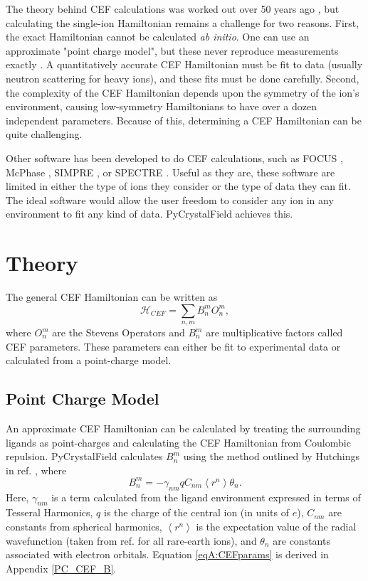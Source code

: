 \documentclass[twocolumn,english,prb]{revtex4-2}
\begin{document}
The theory behind CEF calculations was worked out over 50 years ago \cite{Stevens1952,Hutchings1964}, but  calculating the single-ion Hamiltonian remains a challenge for two reasons. First, the exact Hamiltonian cannot be calculated \textit{ab initio}. One can use an approximate "point charge model", but these never reproduce measurements exactly \cite{EDVARDSSON1998,Mesot1998}. A quantitatively accurate CEF Hamiltonian must be fit to data (usually neutron scattering for heavy ions), and these fits must be done carefully. Second, the complexity of the CEF Hamiltonian depends upon the symmetry of the ion's environment, causing low-symmetry Hamiltonians to have over a dozen independent parameters. Because of this, determining a CEF Hamiltonian can be quite challenging.

Other software has been developed to do CEF calculations, such as FOCUS \cite{FOCUS}, McPhase \cite{McPhase}, SIMPRE \cite{SIMPRE}, or SPECTRE \cite{SPECTRE}. Useful as they are, these software are limited in either the type of ions they consider or the type of data they can fit. The ideal software would allow the user freedom to consider any ion in any environment to fit any kind of data. PyCrystalField achieves this.


\section{Theory}


The general CEF Hamiltonian can be written as 
\begin{equation}
\mathcal{H}_{CEF} =\sum_{n,m} B_{n}^{m}O_{n}^{m},
\end{equation}
where $O_{n}^{m}$ are the Stevens Operators \cite{Stevens1952,Hutchings1964} and $B_{n}^{m}$ are multiplicative factors called CEF parameters. These parameters can either be fit to experimental data or calculated from a point-charge model.

\subsection{Point Charge Model}

An approximate CEF Hamiltonian can be calculated by treating the surrounding ligands as point-charges and calculating the CEF Hamiltonian from Coulombic repulsion. PyCrystalField calculates $B_{n}^{m}$ using the method outlined by Hutchings in ref. \cite{Hutchings1964}, where
\begin{equation}
B_{n}^{m}=-\gamma_{nm}q C_{nm}\left\langle r^{n}\right\rangle \theta_{n}.
\label{eqA:CEFparams}
\end{equation}
Here, $\gamma_{nm}$ is a term calculated from the ligand environment expressed in terms of Tesseral Harmonics, $q$ is the charge of  the central ion (in units of $e$), $C_{nm}$ are constants from spherical harmonics, $\left\langle r^{n}\right\rangle$ is the expectation value of the radial wavefunction (taken from ref. \cite{EDVARDSSON1998} for all rare-earth ions), and $\theta_{n}$ are constants
associated with electron orbitals. Equation \ref{eqA:CEFparams} is derived in Appendix \ref{PC_CEF_B}.
\end{document}
